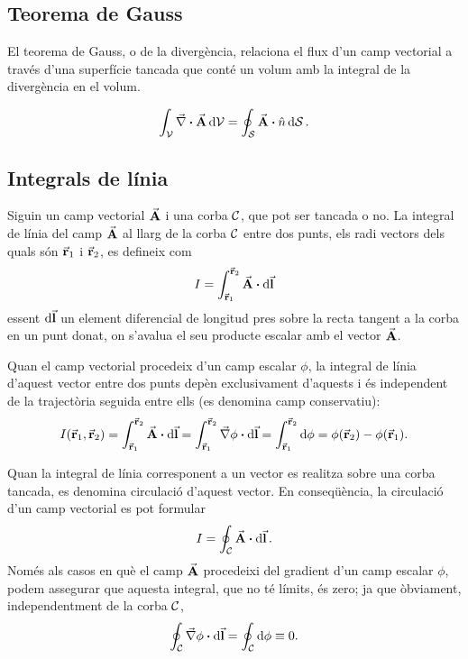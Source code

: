 \subsection{Teorema de Gauss}
El teorema de Gauss, o de la divergència, relaciona el flux d'un camp vectorial a través d'una superfície tancada que conté un volum amb la integral de la divergència en el volum.
\begin{thm}[de Gauss]\label{thm:gauss}
	\begin{align}
		\int_{\mc{V}} \div{A} \dd{\mc{V}} = \oint_{\mc{S}} \va{A} \vdot \hat{n} \dd{\mc{S}}.
	\end{align}
\end{thm}

\subsection{Integrals de línia}
Siguin un camp vectorial $\va{A}$ i una corba $\mathcal{C}$, que pot ser tancada o no. La integral de línia del camp $\va{A}$ al llarg de la corba $\mathcal{C}$ entre dos punts, els radi vectors dels quals són $\va{r}_{1}$ i $\va{r}_{2}$, es defineix com
\begin{align}
	I = \int_{\va{r}_{1}}^{\va{r}_{2}} \va{A} \vdot \dd{\va{l}}
\end{align}
essent $\dd{\va{l}}$ un element diferencial de longitud pres sobre la recta tangent a la corba en un punt donat, on s'avalua el seu producte escalar amb el vector $\va{A}$.
\begin{cor}
	Quan el camp vectorial procedeix d'un camp escalar $\phi$, la integral de línia d'aquest vector entre dos punts depèn exclusivament d'aquests i és independent de la trajectòria seguida entre ells (es denomina camp conservatiu):
	\begin{align}
		I(\va{r}_{1}, \va{r}_{2}) = \int_{\va{r}_{1}}^{\va{r}_{2}} \va{A} \vdot \dd{\va{l}} = \int_{\va{r}_{1}}^{\va{r}_{2}} \grad{\phi} \vdot \dd{\va{l}} = \int_{\va{r}_{1}}^{\va{r}_{2}} \dd{\phi} = \phi(\va{r}_{2}) - \phi(\va{r}_{1}).
	\end{align}
\end{cor}
Quan la integral de línia corresponent a un vector es realitza sobre una corba tancada, es denomina circulació d'aquest vector. En conseqüència, la circulació d'un camp vectorial es pot formular
\begin{align}
	I = \oint_{\mc{C}} \va{A} \vdot \dd{\va{l}}.
\end{align}
Només als casos en què el camp $\va{A}$ procedeixi del gradient d'un camp escalar $\phi$, podem assegurar que aquesta integral, que no té límits, és zero; ja que òbviament, independentment de la corba $\mathcal{C}$,
\begin{align*}
	\oint_{\mc{C}} \grad{\phi} \vdot \dd{\va{l}} = \oint_{\mc{C}} \dd{\phi} \equiv 0.
\end{align*}

